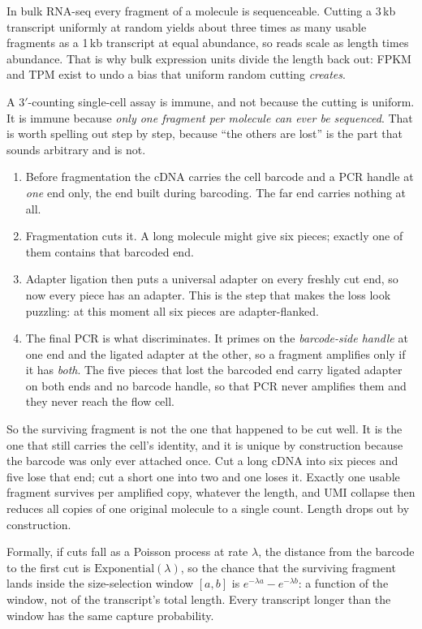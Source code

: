  In bulk
RNA-seq every fragment of a molecule is sequenceable. Cutting a 3\,kb transcript
uniformly at random yields about three times as many usable fragments as a
1\,kb transcript at equal abundance, so reads scale as length times abundance.
That is why bulk expression units divide the length back out: FPKM and TPM exist
to undo a bias that uniform random cutting \emph{creates}.

A 3$'$-counting single-cell assay is immune, and not because the cutting is
uniform. It is immune because \emph{only one fragment per molecule can ever be
sequenced}. That is worth spelling out step by step, because ``the others are
lost'' is the part that sounds arbitrary and is not.

\begin{enumerate}[leftmargin=1.4em,itemsep=1pt,topsep=2pt]
\item Before fragmentation the cDNA carries the cell barcode and a PCR handle at
  \emph{one} end only, the end built during barcoding. The far end carries
  nothing at all.
\item Fragmentation cuts it. A long molecule might give six pieces; exactly one
  of them contains that barcoded end.
\item Adapter ligation then puts a universal adapter on every freshly cut end,
  so now every piece has an adapter. This is the step that makes the loss look
  puzzling: at this moment all six pieces are adapter-flanked.
\item The final PCR is what discriminates. It primes on the
  \emph{barcode-side handle} at one end and the ligated adapter at the other, so
  a fragment amplifies only if it has \emph{both}. The five pieces that lost the
  barcoded end carry ligated adapter on both ends and no barcode handle, so that
  PCR never amplifies them and they never reach the flow cell.
\end{enumerate}

So the surviving fragment is not the one that happened to be cut well. It is the
one that still carries the cell's identity, and it is unique by construction
because the barcode was only ever attached once. Cut a long cDNA into six pieces
and five lose that end; cut a short one into two and one loses it. Exactly one
usable fragment survives per amplified copy, whatever the length, and UMI
collapse then reduces all copies of one original molecule to a single count.
Length drops out by construction.

Formally, if cuts fall as a Poisson process at rate $\lambda$, the distance from
the barcode to the first cut is $\mathrm{Exponential}(\lambda)$, so the chance
that the surviving fragment lands inside the size-selection window $[a,b]$ is
$e^{-\lambda a}-e^{-\lambda b}$: a function of the window, not of the
transcript's total length. Every transcript longer than the window has the same
capture probability.

